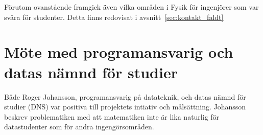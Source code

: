 Förutom ovanstående framgick även vilka områden i Fysik för ingenjörer som var
svåra för studenter. Detta finns redovisat i avsnitt~\ref{sec:kontakt_faldt}

\section{Möte med programansvarig och datas nämnd för studier}

Både Roger Johansson, programansvarig på datateknik, och datas nämnd för studier (DNS)
var positiva till projektets intiativ och målsättning. Johansson beskrev
problematiken med att matematiken inte är lika naturlig för datastudenter som för
andra ingengörsområden.
